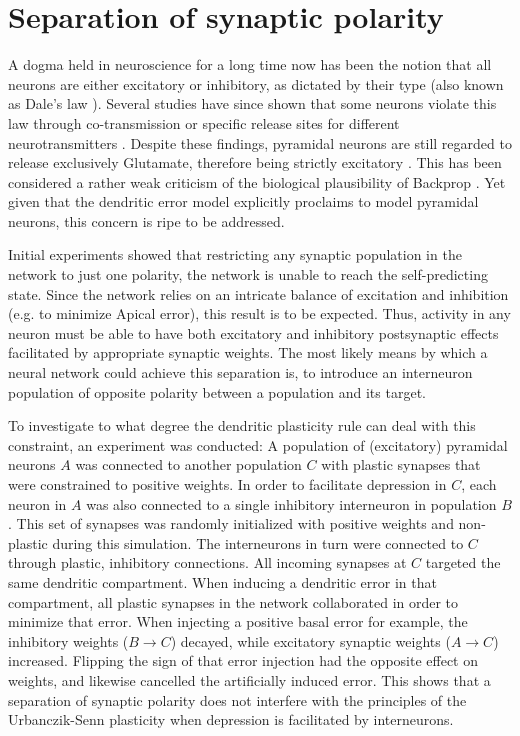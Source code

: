 \section{Separation of synaptic polarity}\label{sec-dales-law}


A dogma held in neuroscience for a long time now has been the notion that all neurons are either excitatory or
inhibitory, as dictated by their type (also known as Dale's law \citep{Kandel1968}). Several studies have since shown
that some neurons violate this law through co-transmission or specific release sites for different neurotransmitters
\citep{Svensson2019,Barranca2022}. Despite these findings, pyramidal neurons are still regarded to release exclusively
Glutamate, therefore being strictly excitatory \citep{gerfen2018long,spruston2008pyramidal,Eyal2018}. This has been
considered a rather weak criticism of the biological plausibility of Backprop \citep{Bartunov2018}. Yet given that the
dendritic error model explicitly proclaims to model pyramidal neurons, this concern is ripe to be addressed.

Initial experiments showed that restricting any synaptic population in the network to just one polarity, the network is
unable to reach the self-predicting state. Since the network relies on an intricate balance of excitation and inhibition
(e.g. to minimize Apical error), this result is to be expected. Thus, activity in any neuron must be able to have both
excitatory and inhibitory postsynaptic effects facilitated by appropriate synaptic weights. The most likely means by
which a neural network could achieve this separation is, to introduce an interneuron population of opposite polarity
between a population and its target.


To investigate to what degree the dendritic plasticity rule can deal with this constraint, an experiment was conducted:
A population of (excitatory) pyramidal neurons $A$  was connected to another population $C$ with plastic synapses that
were constrained to positive weights. In order to facilitate depression in $C$, each neuron in $A$ was also connected to
a single inhibitory interneuron in population $B$. This set of synapses was randomly initialized with positive weights and
non-plastic during this simulation. The interneurons in turn were connected to $C$ through plastic, inhibitory
connections. All incoming synapses at $C$ targeted the same dendritic compartment. When inducing a dendritic error in
that compartment, all plastic synapses in the network collaborated in order to minimize that error. When injecting a
positive basal error for example, the inhibitory weights ($B \rightarrow C$) decayed, while excitatory synaptic weights
($A \rightarrow C$) increased. Flipping the sign of that error injection had the opposite effect on weights, and
likewise cancelled the artificially induced error. This shows that a separation of synaptic polarity does not interfere
with the principles of the Urbanczik-Senn plasticity when depression is facilitated by interneurons.

